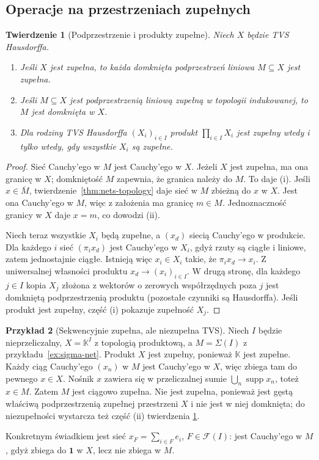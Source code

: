 \documentclass[11pt,a4paper]{article}
\numberwithin{equation}{section}
\theoremstyle{plain}
\newtheorem{twierdzenie}{Twierdzenie}[section]
\theoremstyle{definition}
\newtheorem{przyklad}[twierdzenie]{Przykład}
\theoremstyle{remark}
\newcommand{\K}{\mathbb K}
\DeclareMathOperator{\supp}{supp}
\begin{document}
\subsection{Operacje na przestrzeniach zupełnych}

\begin{twierdzenie}[Podprzestrzenie i produkty zupełne]
\label{thm:closed-complete}
Niech $X$ będzie TVS Hausdorffa.
\begin{enumerate}[label=\textup{(\roman*)}]
\item Jeśli $X$ jest zupełna, to każda domknięta
      podprzestrzeń liniowa $M\subseteq X$ jest zupełna.
\item Jeśli $M\subseteq X$ jest podprzestrzenią liniową zupełną
      w topologii indukowanej, to $M$ jest domknięta w $X$.
\item Dla rodziny TVS Hausdorffa $(X_i)_{i\in I}$ produkt
      $\prod_{i\in I}X_i$ jest zupełny wtedy i tylko wtedy,
      gdy wszystkie $X_i$ są zupełne.
\end{enumerate}
\end{twierdzenie}
\begin{proof}
Sieć Cauchy'ego w $M$ jest Cauchy'ego w $X$.
Jeżeli $X$ jest zupełna, ma ona granicę w $X$; domkniętość
$M$ zapewnia, że granica należy do $M$. To daje (i).
Jeśli $x\in\overline M$, twierdzenie~\ref{thm:nets-topology}
daje sieć w $M$ zbieżną do $x$ w $X$. Jest ona Cauchy'ego
w $M$, więc z założenia ma granicę $m\in M$.
Jednoznaczność granicy w $X$ daje $x=m$, co dowodzi (ii).

Niech teraz wszystkie $X_i$ będą zupełne, a $(x_d)$
siecią Cauchy'ego w produkcie. Dla każdego $i$ sieć
$(\pi_i x_d)$ jest Cauchy'ego w $X_i$, gdyż rzuty
są ciągłe i liniowe, zatem jednostajnie ciągłe.
Istnieją więc $x_i\in X_i$ takie, że $\pi_i x_d\to x_i$.
Z uniwersalnej własności produktu $x_d\to(x_i)_{i\in I}$.
W drugą stronę, dla każdego $j\in I$ kopia $X_j$
złożona z wektorów o zerowych współrzędnych poza $j$
jest domkniętą podprzestrzenią produktu (pozostałe czynniki
są Hausdorffa). Jeśli produkt jest zupełny, część (i)
pokazuje zupełność $X_j$.
\end{proof}

\begin{przyklad}[Sekwencyjnie zupełna, ale niezupełna TVS]
\label{ex:seq-not-complete}
Niech $I$ będzie nieprzeliczalny, $X=\K^I$ z topologią
produktową, a $M=\Sigma(I)$ z przykładu~\ref{ex:sigma-net}.
Produkt $X$ jest zupełny, ponieważ $\K$ jest zupełne.
Każdy ciąg Cauchy'ego $(x_n)$ w $M$ jest Cauchy'ego w $X$,
więc zbiega tam do pewnego $x\in X$. Nośnik $x$ zawiera
się w przeliczalnej sumie $\bigcup_n\supp x_n$, toteż $x\in M$.
Zatem $M$ jest ciągowo zupełna. Nie jest zupełna,
ponieważ jest gęstą właściwą podprzestrzenią zupełnej
przestrzeni $X$ i nie jest w niej domknięta; do
niezupełności wystarcza też część (ii) twierdzenia
\ref{thm:closed-complete}.

Konkretnym świadkiem jest sieć $x_F=\sum_{i\in F}e_i$,
$F\in\mathcal F(I)$: jest Cauchy'ego w $M$, gdyż
zbiega do $\mathbf1$ w $X$, lecz nie zbiega w $M$.
\end{przyklad}
\end{document}
